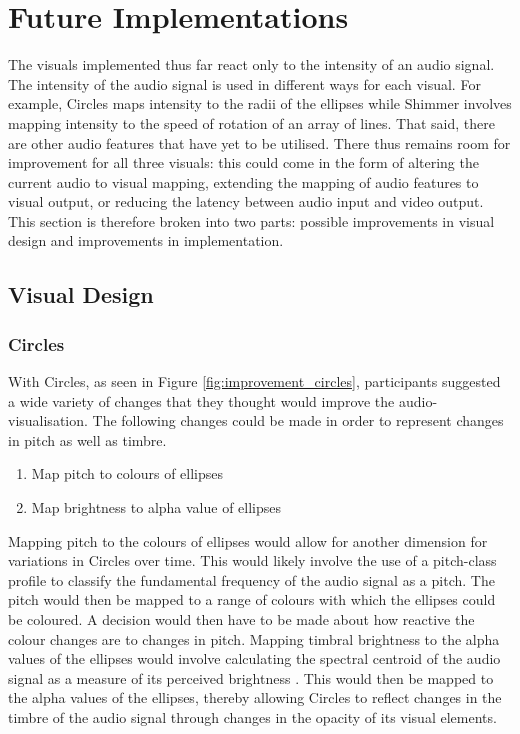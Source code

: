 \documentclass[../initial_thesis.tex]{subfiles}
\begin{document}
\section{Future Implementations}
The visuals implemented thus far react only to the intensity of an audio signal. The intensity of the audio signal is used in different ways for each visual. For example, Circles maps intensity to the radii of the ellipses while Shimmer involves mapping intensity to the speed of rotation of an array of lines. That said, there are other audio features that have yet to be utilised. There thus remains room for improvement for all three visuals: this could come in the form of altering the current audio to visual mapping, extending the mapping of audio features to visual output, or reducing the latency between audio input and video output. This section is therefore broken into two parts: possible improvements in visual design and improvements in implementation.

\subsection{Visual Design}
\subsubsection{Circles}
With Circles, as seen in Figure \ref{fig:improvement_circles}, participants suggested a wide variety of changes that they thought would improve the audio-visualisation. The following changes could be made in order to represent changes in pitch as well as timbre.

\begin{enumerate}
\item {Map pitch to colours of ellipses}
\item {Map brightness to alpha value of ellipses}
\end{enumerate}

Mapping pitch to the colours of ellipses would allow for another dimension for variations in Circles over time. This would likely involve the use of a pitch-class profile to classify the fundamental frequency of the audio signal as a pitch. The pitch would then be mapped to a range of colours with which the ellipses could be coloured. A decision would then have to be made about how reactive the colour changes are to changes in pitch. Mapping timbral brightness to the alpha values of the ellipses would involve calculating the spectral centroid of the audio signal as a measure of its perceived brightness \cite{Schubert}. This would then be mapped to the alpha values of the ellipses, thereby allowing Circles to reflect changes in the timbre of the audio signal through changes in the opacity of its visual elements.
\end{document}
